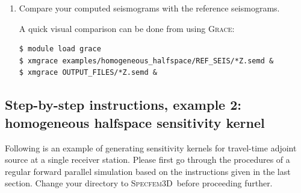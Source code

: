 \documentclass[10pt,fleqn,letterpaper]{article}
\newcommand{\specfem}{\textsc{Specfem3D}}
\newcommand{\grace}{\textsc{Grace}}
\begin{document}
\begin{enumerate}
\item Compare your computed seismograms with the reference seismograms.

A quick visual comparison can be done from  using \grace:
\begin{lstlisting}
$ module load grace
$ xmgrace examples/homogeneous_halfspace/REF_SEIS/*Z.semd &
$ xmgrace OUTPUT_FILES/*Z.semd &
\end{lstlisting}

\end{enumerate}


\subsection*{Step-by-step instructions, example 2: homogeneous halfspace sensitivity kernel}
Following is an example of generating sensitivity kernels for travel-time adjoint source at a single receiver station. Please first go through the procedures of a regular forward parallel simulation based on the instructions given in the last section. Change your directory to \specfem\ before proceeding further.
\end{document}
